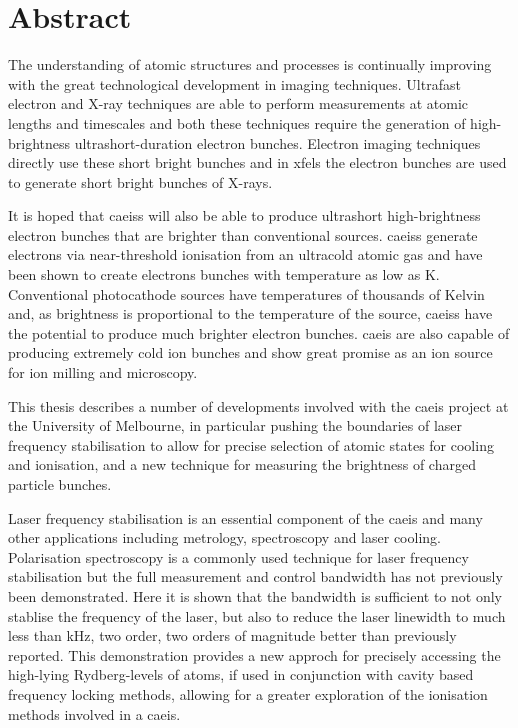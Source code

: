 \chapter*{Abstract}

The understanding of atomic structures and processes is continually improving with the great technological development in imaging techniques.
Ultrafast electron and X-ray techniques are able to perform measurements at atomic lengths and timescales and both these techniques require the generation of high-brightness ultrashort-duration electron bunches.
Electron imaging techniques directly use these short bright bunches and in \glspl{xfel} the electron bunches are used to generate short bright bunches of X-rays.

It is hoped that \glspl{caeis} will also be able to produce ultrashort high-brightness electron bunches that are brighter than conventional sources.
\Glspl{caeis} generate electrons via near-threshold ionisation from an ultracold atomic gas and have been shown to create electrons bunches with temperature as low as \unit[10]{K}.
Conventional photocathode sources have temperatures of thousands of Kelvin and, as brightness is proportional to the temperature of the source, \glspl{caeis} have the potential to produce much brighter electron bunches.
\Gls{caeis} are also capable of producing extremely cold ion bunches and show great promise as an ion source for ion milling and microscopy.

This thesis describes a number of developments involved with the \gls{caeis} project at the University of Melbourne, in particular pushing the boundaries of laser frequency stabilisation to allow for precise selection of atomic states for cooling and ionisation, and a new technique for measuring the brightness of charged particle bunches.

Laser frequency stabilisation is an essential component of the \gls{caeis} and many other applications including metrology, spectroscopy and laser cooling.
Polarisation spectroscopy is a commonly used technique for laser frequency stabilisation but the full measurement and control bandwidth has not previously been demonstrated.
Here it is shown that the bandwidth is sufficient to not only stablise the frequency of the laser, but also to reduce the laser linewidth to much less than \unit[1]{kHz}, two order, two orders of magnitude better than previously reported.
This demonstration provides a new approch for precisely accessing the high-lying Rydberg-levels of atoms, if used in conjunction with cavity based frequency locking methods, allowing for a greater exploration of the ionisation methods involved in a \gls{caeis}.

